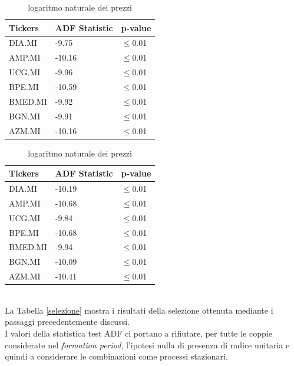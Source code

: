 \documentclass[]{article}
\begin{document}
\begin{table}[H]
	
	\caption{Test di radice unitaria per per le differenze dei titoli nel \textit{formation period}}
	\begin{minipage}{.4\textwidth}
		\centering
		\caption{Prezzi}
		\begin{tabular}{@{}lll@{}}
			\toprule
			Tickers & ADF Statistic & p-value \\ \midrule
			DIA.MI  & -9.75         & $\le$0.01    \\
			AMP.MI  & -10.16        &$\le$0.01    \\
			UCG.MI  & -9.96         &$\le$0.01    \\
			BPE.MI  & -10.59        & $\le$0.01    \\
			BMED.MI & -9.92         & $\le$0.01    \\
			BGN.MI  & -9.91         & $\le$0.01    \\
			AZM.MI  & -10.16        & $\le$0.01    \\ \bottomrule
		\end{tabular}
	\end{minipage}
	\begin{minipage}{.7\textwidth}
		\centering
		\caption{logaritmo naturale dei prezzi}
	\begin{tabular}{@{}lll@{}}
		\toprule
		Tickers & ADF Statistic & p-value \\ \midrule
		DIA.MI  & -10.19        & $\le$0.01    \\
		AMP.MI  & -10.68        & $\le$0.01    \\
		UCG.MI  & -9.84         & $\le$0.01    \\
		BPE.MI  & -10.68        & $\le$0.01    \\
		BMED.MI & -9.94         & $\le$0.01    \\
		BGN.MI  & -10.09        &$\le$0.01    \\
		AZM.MI  & -10.41        & $\le$0.01    \\ \bottomrule
	\end{tabular}
	\end{minipage}
\label{tit_diff_staz}
\end{table}
\
\\
La Tabella \ref{selezione} mostra i risultati della selezione ottenuta mediante i passaggi precedentemente discussi.
\\
I valori della statistica test ADF ci portano a rifiutare, per tutte le coppie considerate nel \textit{formation period}, l'ipotesi nulla di presenza di radice unitaria e quindi a considerare le combinazioni come processi stazionari.
\end{document}
